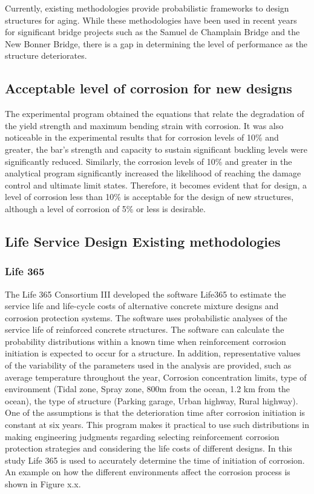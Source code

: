 Currently, existing methodologies provide probabilistic frameworks to design structures for aging. While these methodologies have been used in recent years for significant bridge projects such as the Samuel de Champlain Bridge and the New Bonner Bridge, there is a gap in determining the level of performance as the structure deteriorates.

\subsection{Acceptable level of corrosion for new designs}
The experimental program obtained the equations that relate the degradation of the yield strength and maximum bending strain with corrosion. It was also noticeable in the experimental results that for corrosion levels of 10\% and greater, the bar's strength and capacity to sustain significant buckling levels were significantly reduced. Similarly, the corrosion levels of 10\% and greater in the analytical program significantly increased the likelihood of reaching the damage control and ultimate limit states. Therefore, it becomes evident that for design, a level of corrosion less than 10\% is acceptable for the design of new structures, although a level of corrosion of 5\% or less is desirable.

\subsection{Life Service Design Existing methodologies}

\subsubsection{Life 365}
The Life 365 Consortium III developed the software Life365 to estimate the service life and life-cycle costs of alternative concrete mixture designs and corrosion protection systems\cite{Bentz2003}. The software uses probabilistic analyses of the service life of reinforced concrete structures. The software can calculate the probability distributions within a known time when reinforcement corrosion initiation is expected to occur for a structure. In addition, representative values of the variability of the parameters used in the analysis are provided, such as average temperature throughout the year, Corrosion concentration limits, type of environment (Tidal zone, Spray zone, 800m from the ocean, 1.2 km from the ocean), the type of structure (Parking garage, Urban highway, Rural highway). One of the assumptions is that the deterioration time after corrosion initiation is constant at six years. This program makes it practical to use such distributions in making engineering judgments regarding selecting reinforcement corrosion protection strategies and considering the life costs of different designs. In this study Life 365 is used to accurately determine the time of initiation of corrosion. An example on how the different environments affect the corrosion process is shown in Figure x.x.

